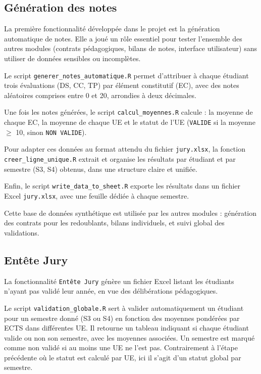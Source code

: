 \subsection{Génération des notes}
La première fonctionnalité développée dans le projet est la génération automatique de notes. Elle a joué un rôle essentiel pour tester l’ensemble des autres modules (contrats pédagogiques, bilans de notes, interface utilisateur) sans utiliser de données sensibles ou incomplètes.

\vspace{0.5em}
Le script \texttt{generer\_notes\_automatique.R} permet d’attribuer à chaque étudiant trois évaluations (DS, CC, TP) par élément constitutif (EC), avec des notes aléatoires comprises entre 0 et 20, arrondies à deux décimales.

\vspace{0.5em}
Une fois les notes générées, le script \texttt{calcul\_moyennes.R} calcule : la moyenne de chaque EC, la moyenne de chaque UE et le statut de l’UE (\texttt{VALIDE} si la moyenne $\geq$ 10, sinon \texttt{NON VALIDE}).

\vspace{0.5em}
Pour adapter ces données au format attendu du fichier \texttt{jury.xlsx}, la fonction \texttt{creer\_ligne\_unique.R} extrait et organise les résultats par étudiant et par semestre (S3, S4) obtenus, dans une structure claire et unifiée.

\vspace{0.5em}
Enfin, le script \texttt{write\_data\_to\_sheet.R} exporte les résultats dans un fichier Excel \texttt{jury.xlsx}, avec une feuille dédiée à chaque semestre.

\vspace{0.5em}
Cette base de données synthétique est utilisée par les autres modules : génération des contrats pour les redoublants, bilans individuels, et suivi global des validations.

\subsection{Entête Jury}
La fonctionnalité \texttt{Entête Jury} génère un fichier Excel listant les étudiants n’ayant pas validé leur année, en vue des délibérations pédagogiques.

\vspace{0.5em}
Le script \texttt{validation\_globale.R} sert à valider automatiquement un étudiant pour un semestre donné (S3 ou S4) en fonction des moyennes pondérées par ECTS dans différentes UE. Il retourne un tableau indiquant si chaque étudiant valide ou non son semestre, avec les moyennes associées. Un semestre est marqué comme non validé si au moins une UE ne l’est pas. Contrairement à l’étape précédente où le statut est calculé par UE, ici il s’agit d’un statut global par semestre.

